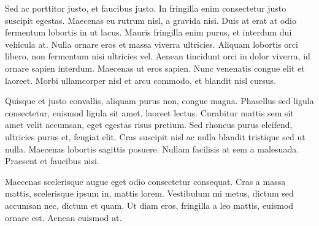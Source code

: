 Sed ac porttitor justo, et faucibus justo. In fringilla enim consectetur justo suscipit egestas. Maecenas eu rutrum nisl, a gravida nisi. Duis at erat at odio fermentum lobortis in ut lacus. Mauris fringilla enim purus, et interdum dui vehicula at. Nulla ornare eros et massa viverra ultricies. Aliquam lobortis orci libero, non fermentum nisi ultricies vel. Aenean tincidunt orci in dolor viverra, id ornare sapien interdum. Maecenas ut eros sapien. Nunc venenatis congue elit et laoreet. Morbi ullamcorper nisl et arcu commodo, et blandit nisl cursus.

Quisque et justo convallis, aliquam purus non, congue magna. Phasellus sed ligula consectetur, euismod ligula sit amet, laoreet lectus. Curabitur mattis sem sit amet velit accumsan, eget egestas risus pretium. Sed rhoncus purus eleifend, ultricies purus et, feugiat elit. Cras suscipit nisl ac nulla blandit tristique sed ut nulla. Maecenas lobortis sagittis posuere. Nullam facilisis at sem a malesuada. Praesent et faucibus nisi.

Maecenas scelerisque augue eget odio consectetur consequat. Cras a massa mattis, scelerisque ipsum in, mattis lorem. Vestibulum mi metus, dictum sed accumsan nec, dictum et quam. Ut diam eros, fringilla a leo mattis, euismod ornare est. Aenean euismod at. 

